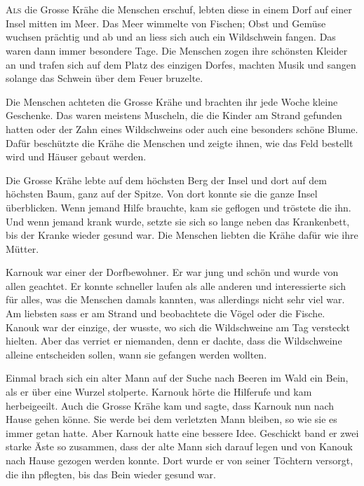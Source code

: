 \chapter*{}
\lettrine[lines=2]{\color{red}A}{ls} die Grosse Krähe die Menschen erschuf, lebten diese in einem Dorf auf einer Insel mitten im Meer. Das Meer wimmelte von Fischen; Obst und Gemüse wuchsen prächtig und ab und an liess sich auch ein Wildschwein fangen. Das waren dann immer besondere Tage. Die Menschen zogen ihre schönsten Kleider an und trafen sich auf dem Platz des einzigen Dorfes, machten Musik und sangen solange das Schwein über dem Feuer bruzelte.

Die Menschen achteten die Grosse Krähe und brachten ihr jede Woche kleine Geschenke. Das waren meistens Muscheln, die die Kinder am Strand gefunden hatten oder der Zahn eines Wildschweins oder auch eine besonders schöne Blume. Dafür beschützte die Krähe die Menschen und zeigte ihnen, wie das Feld bestellt wird und Häuser gebaut werden.

Die Grosse Krähe lebte auf dem höchsten Berg der Insel und dort auf dem höchsten Baum, ganz auf der Spitze. Von dort konnte sie die ganze Insel überblicken. Wenn jemand Hilfe brauchte, kam sie geflogen und tröstete die ihn. Und wenn jemand krank wurde, setzte sie sich so lange neben das Krankenbett, bis der Kranke wieder gesund war. Die Menschen liebten die Krähe dafür wie ihre Mütter.

Karnouk war einer der Dorfbewohner. Er war jung und schön und wurde von allen geachtet. Er konnte schneller laufen als alle anderen und interessierte sich für alles, was die Menschen damals kannten, was allerdings nicht sehr viel war. Am liebsten sass er am Strand und beobachtete die Vögel oder die Fische. Kanouk war der einzige, der wusste, wo sich die Wildschweine am Tag versteckt hielten. Aber das verriet er niemanden, denn er dachte, dass die Wildschweine alleine entscheiden sollen, wann sie gefangen werden wollten.

Einmal brach sich ein alter Mann auf der Suche nach Beeren im Wald ein Bein, als er über eine Wurzel stolperte. Karnouk hörte die Hilferufe und kam herbeigeeilt. Auch die Grosse Krähe kam und sagte, dass Karnouk nun nach Hause gehen könne. Sie werde bei dem verletzten Mann bleiben, so wie sie es immer getan hatte. Aber Karnouk hatte eine bessere Idee. Geschickt band er zwei starke Äste so zusammen, dass der alte Mann sich darauf legen und von Kanouk nach Hause gezogen werden konnte. Dort wurde er von seiner Töchtern versorgt, die ihn pflegten, bis das Bein wieder gesund war.

